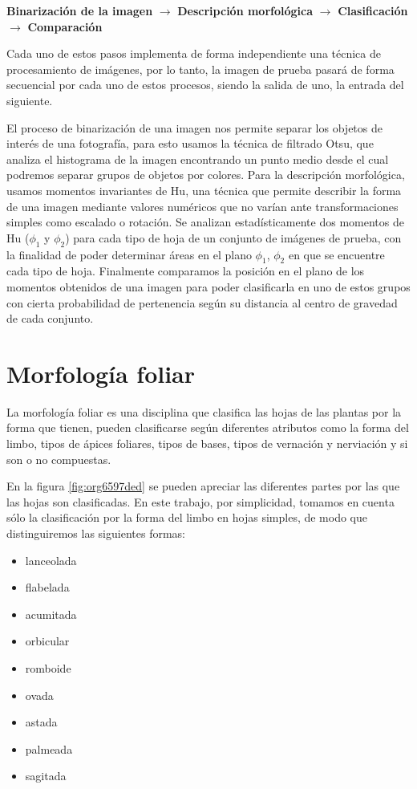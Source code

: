 \documentclass[letter]{article}
\begin{document}
\begin{center}
\textbf{Binarización de la imagen} \(\rightarrow\) \textbf{Descripción morfológica} \(\rightarrow\)
 \textbf{Clasificación} \(\rightarrow\) \textbf{Comparación}
\end{center}

Cada uno de estos pasos implementa de forma independiente una técnica de
procesamiento de imágenes, por lo tanto, la imagen de prueba pasará de forma
secuencial por cada uno de estos procesos, siendo la salida de uno, la entrada
del siguiente.

El proceso de binarización de una imagen nos permite separar los objetos de
interés de una fotografía, para esto usamos la técnica de filtrado Otsu, que
analiza el histograma de la imagen encontrando un punto medio desde el cual
podremos separar grupos de objetos por colores. Para la descripción morfológica,
usamos momentos invariantes de Hu, una técnica que permite describir la forma de
una imagen mediante valores numéricos que no varían ante transformaciones
simples como escalado o rotación. Se analizan estadísticamente dos momentos de
Hu (\(\phi_1\) y \(\phi_2\)) para cada tipo de hoja de un conjunto de imágenes de
prueba, con la finalidad de poder determinar áreas en el plano \(\phi_1\), \(\phi_2\)
en que se encuentre cada tipo de hoja. Finalmente comparamos la posición en el
plano de los momentos obtenidos de una imagen para poder clasificarla en uno de
estos grupos con cierta probabilidad de pertenencia según su distancia al
centro de gravedad de cada conjunto.

\section{Morfología foliar}
\label{sec:org1436cda}
La morfología foliar es una disciplina que clasifica las hojas de las plantas
por la forma que tienen, pueden clasificarse según diferentes atributos como la
forma del limbo, tipos de ápices foliares, tipos de bases, tipos de vernación y
nerviación y si son o no compuestas.

En la figura \ref{fig:org6597ded} se pueden apreciar las diferentes partes por las que las
hojas son clasificadas. En este trabajo, por simplicidad, tomamos en cuenta sólo
la clasificación por la forma del limbo en hojas simples, de modo que
distinguiremos las siguientes formas:

\begin{itemize}
\item lanceolada
\item flabelada
\item acumitada
\item orbicular
\item romboide
\item ovada
\item astada
\item palmeada
\item sagitada
\end{itemize}
\end{document}
